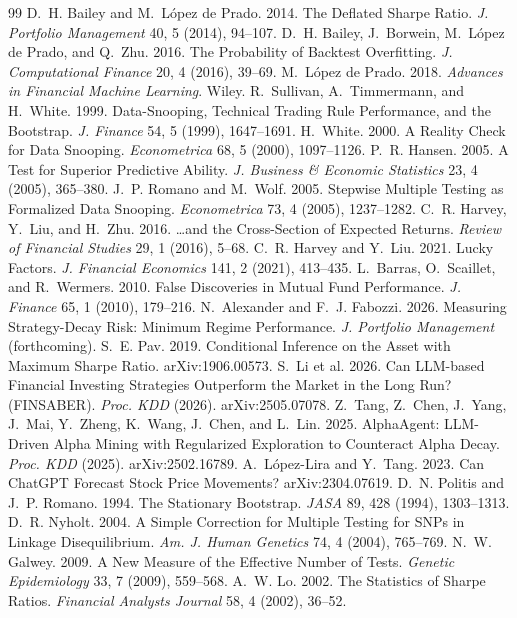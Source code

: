 \documentclass[sigconf,review,anonymous]{acmart}
\begin{document}

\begin{thebibliography}{99}
\small
{} D.~H. Bailey and M.~L\'opez de Prado. 2014. The Deflated Sharpe Ratio. \emph{J. Portfolio Management} 40, 5 (2014), 94--107.
 D.~H. Bailey, J.~Borwein, M.~L\'opez de Prado, and Q.~Zhu. 2016. The Probability of Backtest Overfitting. \emph{J. Computational Finance} 20, 4 (2016), 39--69.
 M.~L\'opez de Prado. 2018. \emph{Advances in Financial Machine Learning}. Wiley.
 R.~Sullivan, A.~Timmermann, and H.~White. 1999. Data-Snooping, Technical Trading Rule Performance, and the Bootstrap. \emph{J. Finance} 54, 5 (1999), 1647--1691.
 H.~White. 2000. A Reality Check for Data Snooping. \emph{Econometrica} 68, 5 (2000), 1097--1126.
 P.~R. Hansen. 2005. A Test for Superior Predictive Ability. \emph{J. Business \& Economic Statistics} 23, 4 (2005), 365--380.
 J.~P. Romano and M.~Wolf. 2005. Stepwise Multiple Testing as Formalized Data Snooping. \emph{Econometrica} 73, 4 (2005), 1237--1282.
 C.~R. Harvey, Y.~Liu, and H.~Zhu. 2016. \ldots and the Cross-Section of Expected Returns. \emph{Review of Financial Studies} 29, 1 (2016), 5--68.
 C.~R. Harvey and Y.~Liu. 2021. Lucky Factors. \emph{J. Financial Economics} 141, 2 (2021), 413--435.
 L.~Barras, O.~Scaillet, and R.~Wermers. 2010. False Discoveries in Mutual Fund Performance. \emph{J. Finance} 65, 1 (2010), 179--216.
 N.~Alexander and F.~J. Fabozzi. 2026. Measuring Strategy-Decay Risk: Minimum Regime Performance. \emph{J. Portfolio Management} (forthcoming).
 S.~E. Pav. 2019. Conditional Inference on the Asset with Maximum Sharpe Ratio. arXiv:1906.00573.
 S.~Li et al. 2026. Can LLM-based Financial Investing Strategies Outperform the Market in the Long Run? (FINSABER). \emph{Proc. KDD} (2026). arXiv:2505.07078.
 Z.~Tang, Z.~Chen, J.~Yang, J.~Mai, Y.~Zheng, K.~Wang, J.~Chen, and L.~Lin. 2025. AlphaAgent: LLM-Driven Alpha Mining with Regularized Exploration to Counteract Alpha Decay. \emph{Proc. KDD} (2025). arXiv:2502.16789.
 A.~L\'opez-Lira and Y.~Tang. 2023. Can ChatGPT Forecast Stock Price Movements? arXiv:2304.07619.
 D.~N. Politis and J.~P. Romano. 1994. The Stationary Bootstrap. \emph{JASA} 89, 428 (1994), 1303--1313.
 D.~R. Nyholt. 2004. A Simple Correction for Multiple Testing for SNPs in Linkage Disequilibrium. \emph{Am. J. Human Genetics} 74, 4 (2004), 765--769.
 N.~W. Galwey. 2009. A New Measure of the Effective Number of Tests. \emph{Genetic Epidemiology} 33, 7 (2009), 559--568.
 A.~W. Lo. 2002. The Statistics of Sharpe Ratios. \emph{Financial Analysts Journal} 58, 4 (2002), 36--52.
\end{thebibliography}
\end{document}
